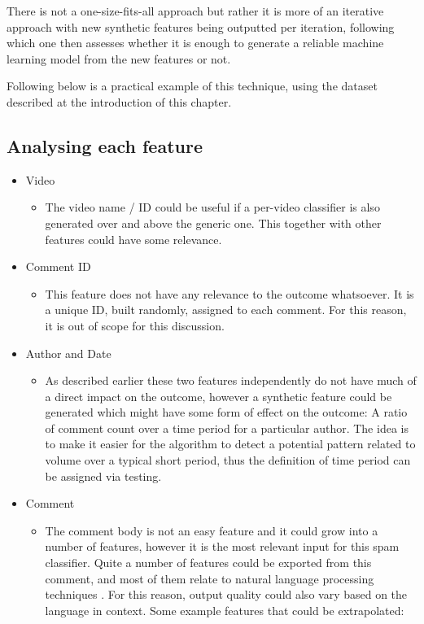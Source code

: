 There is not a one-size-fits-all approach but rather it is more of an iterative approach with new synthetic features being outputted per iteration, following which one then assesses whether it is enough to generate a reliable machine learning model from the new features or not.

Following below is a practical example of this technique, using the dataset described at the introduction of this chapter.

\subsection{Analysing each feature} 

\begin{itemize}
    \item Video
    \begin{itemize}
        \item The video name / ID could be useful if a per-video classifier is also generated over and above the generic one. This together with other features could have some relevance.
    \end{itemize}
    \item Comment ID
    \begin{itemize}
        \item This feature does not have any relevance to the outcome whatsoever. It is a unique ID, built randomly, assigned to each comment. For this reason, it is out of scope for this discussion.
    \end{itemize}
    \item Author and Date
    \begin{itemize}
        \item As described earlier these two features independently do not have much of a direct impact on the outcome, however a synthetic feature could be generated which might have some form of effect on the outcome: A ratio of comment count over a time period for a particular author.
        The idea is to make it easier for the algorithm to detect a potential pattern related to volume over a typical short period, thus the definition of time period can be assigned via testing.
    \end{itemize}
    \item Comment
    \begin{itemize}
    \item The comment body is not an easy feature and it could grow into a number of features, however it is the most relevant input for this spam classifier.
    Quite a number of features could be exported from this comment, and most of them relate to natural language processing techniques \citep{CormackSMSFilter}. For this reason, output quality could also vary based on the language in context.
    Some example features that could be extrapolated:
    \end{itemize}
\end{itemize}

